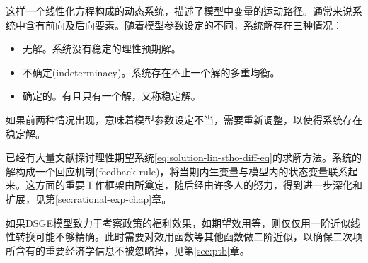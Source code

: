 这样一个线性化方程构成的动态系统，描述了模型中变量的运动路径。通常来说系统中含有前向及后向要素。随着模型参数设定的不同，系统解存在三种情况：
\begin{itemize}
  \item 无解。系统没有稳定的理性预期解。
  \item 不确定(indeterminacy)。系统存在不止一个解的多重均衡。
  \item 确定的。有且只有一个解，又称稳定解。
\end{itemize}
如果前两种情况出现，意味着模型参数设定不当，需要重新调整，以使得系统存在稳定解。

已经有大量文献探讨理性期望系统\eqref{eq:solution-lin-stho-diff-eq}的求解方法。系统的解构成一个回应机制(feedback rule)，将当期内生变量与模型内的状态变量联系起来。这方面的重要工作框架由\cite{Blanchard:1980gi}所奠定，随后经由许多人的努力，得到进一步深化和扩展，见第\ref{sec:rational-exp-chap}章。

如果DSGE模型致力于考察政策的福利效果，如期望效用等，则仅仅用一阶近似线性转换可能不够精确。此时需要对效用函数等其他函数做二阶近似，以确保二次项所含有的重要经济学信息不被忽略掉\citep{Kim:2003hf,SchmittGroh:2004da}，见第\ref{sec:ptb}章。
